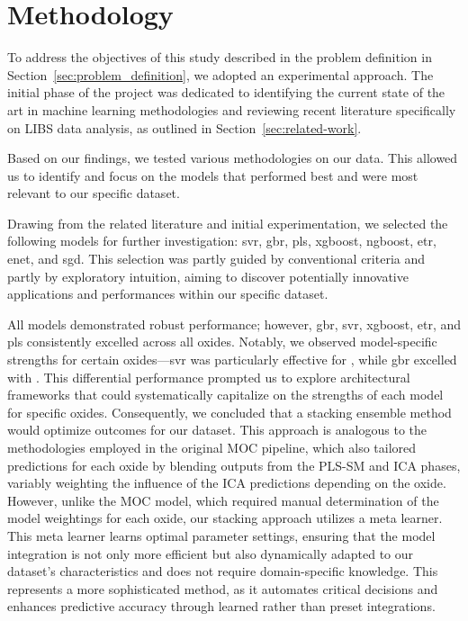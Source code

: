 \section{Methodology}\label{sec:methodology}
To address the objectives of this study described in the problem definition in Section~\ref{sec:problem_definition}, we adopted an experimental approach.
The initial phase of the project was dedicated to identifying the current state of the art in machine learning methodologies and reviewing recent literature specifically on LIBS data analysis, as outlined in Section~\ref{sec:related-work}.

Based on our findings, we tested various methodologies on our data.
This allowed us to identify and focus on the models that performed best and were most relevant to our specific dataset.

Drawing from the related literature and initial experimentation, we selected the following models for further investigation: \gls{svr}, \gls{gbr}, \gls{pls}, \gls{xgboost}, \gls{ngboost}, \gls{etr}, \gls{enet}, and \gls{sgd}.
This selection was partly guided by conventional criteria and partly by exploratory intuition, aiming to discover potentially innovative applications and performances within our specific dataset.

All models demonstrated robust performance; however, \gls{gbr}, \gls{svr}, \gls{xgboost}, \gls{etr}, and \gls{pls} consistently excelled across all oxides.
Notably, we observed model-specific strengths for certain oxides—\gls{svr} was particularly effective for , while \gls{gbr} excelled with .
This differential performance prompted us to explore architectural frameworks that could systematically capitalize on the strengths of each model for specific oxides.
Consequently, we concluded that a stacking ensemble method would optimize outcomes for our dataset.
This approach is analogous to the methodologies employed in the original MOC pipeline, which also tailored predictions for each oxide by blending outputs from the PLS-SM and ICA phases, variably weighting the influence of the ICA predictions depending on the oxide.
However, unlike the MOC model, which required manual determination of the model weightings for each oxide, our stacking approach utilizes a meta learner.
This meta learner learns optimal parameter settings, ensuring that the model integration is not only more efficient but also dynamically adapted to our dataset's characteristics and does not require domain-specific knowledge.
This represents a more sophisticated method, as it automates critical decisions and enhances predictive accuracy through learned rather than preset integrations.

